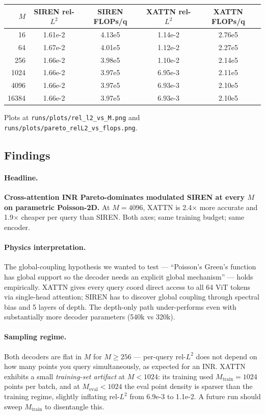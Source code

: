 \documentclass[11pt]{article}
\begin{document}
\begin{center}
\begin{tabular}{rcccc}
\toprule
$M$ & SIREN rel-$L^2$ & SIREN FLOPs/q & XATTN rel-$L^2$ & XATTN FLOPs/q \\
\midrule
16    & 1.61e-2 & 4.13e5 & 1.14e-2 & 2.76e5 \\
64    & 1.67e-2 & 4.01e5 & 1.12e-2 & 2.27e5 \\
256   & 1.66e-2 & 3.98e5 & 1.10e-2 & 2.14e5 \\
1024  & 1.66e-2 & 3.97e5 & 6.95e-3 & 2.11e5 \\
4096  & 1.66e-2 & 3.97e5 & 6.93e-3 & 2.10e5 \\
16384 & 1.66e-2 & 3.97e5 & 6.93e-3 & 2.10e5 \\
\bottomrule
\end{tabular}
\end{center}

Plots at \texttt{runs/plots/rel\_l2\_vs\_M.png} and
\texttt{runs/plots/pareto\_relL2\_vs\_flops.png}.

\subsection*{Findings}

\paragraph{Headline.} \textbf{Cross-attention INR Pareto-dominates
modulated SIREN at every $M$ on parametric Poisson-2D.} At $M=4096$, XATTN
is 2.4$\times$ more accurate and 1.9$\times$ cheaper per query than SIREN.
Both axes; same training budget; same encoder.

\paragraph{Physics interpretation.} The global-coupling hypothesis we
wanted to test --- ``Poisson's Green's function has global support so the
decoder needs an explicit global mechanism'' --- holds empirically. XATTN
gives every query coord direct access to all 64 ViT tokens via single-head
attention; SIREN has to discover global coupling through spectral bias and
5 layers of depth. The depth-only path under-performs even with substantially
more decoder parameters (540k vs 320k).

\paragraph{Sampling regime.} Both decoders are flat in $M$ for $M \geq 256$
--- per-query rel-$L^2$ does not depend on how many points you query
simultaneously, as expected for an INR. XATTN exhibits a small
\emph{training-set artifact} at $M < 1024$: its training used $M_{\text{train}}=1024$
points per batch, and at $M_{\text{eval}}<1024$ the eval point density is
sparser than the training regime, slightly inflating rel-$L^2$ from 6.9e-3
to 1.1e-2. A future run should sweep $M_{\text{train}}$ to disentangle this.
\end{document}
